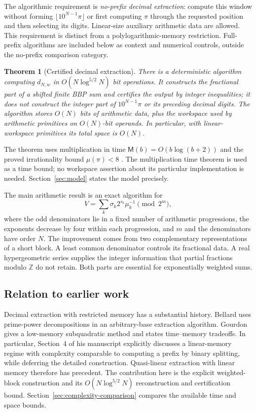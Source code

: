 \documentclass[11pt]{article}
\numberwithin{equation}{section}
\newtheorem{theorem}{Theorem}[section]
\theoremstyle{definition}
\newcommand{\Z}{\mathbb Z}
\newcommand{\M}{\mathsf M}
\begin{document}
The algorithmic requirement is \emph{no-prefix decimal extraction}:
compute this window without forming $\lfloor10^{N-1}\pi\rfloor$ or
first computing $\pi$ through the requested position and then selecting
its digits. Linear-size auxiliary arithmetic data are allowed. This
requirement is distinct from a polylogarithmic-memory restriction.
Full-prefix algorithms are included below as context and numerical
controls, outside the no-prefix comparison category.

\begin{theorem}[Certified decimal extraction]\label{thm:main}
There is a deterministic algorithm computing $d_{N,w}$ in
$O(N\log^{5/2}N)$ bit operations. It constructs the fractional part of a
shifted finite BBP sum and certifies the output by integer inequalities;
it does not construct the integer part of $10^{N-1}\pi$ or its preceding
decimal digits. The algorithm stores $O(N)$ bits of arithmetic data,
plus the workspace used by arithmetic primitives on $O(N)$-bit operands.
In particular, with linear-workspace primitives its total space is $O(N)$.
\end{theorem}

The theorem uses multiplication in time
$\M(b)=O(b\log(b+2))$ \cite{HvdH21} and the proved irrationality bound
$\mu(\pi)<8$ \cite{ZZ20}. The multiplication time theorem is used as a
time bound; no workspace assertion about its particular implementation
is needed. Section~\ref{sec:model} states the model precisely.

The main arithmetic result is an exact algorithm for
\begin{equation}\label{eq:core-intro}
 V=\sum_k \sigma_k 2^{s_k}\mu_k^{-1}\pmod{2^m},
\end{equation}
where the odd denominators lie in a fixed number of arithmetic
progressions, the exponents decrease by four within each progression,
and $m$ and the denominators have order $N$.
The improvement comes from two complementary representations of a
short block. A least common denominator controls its fractional data.
A real hypergeometric series supplies the integer information that
partial fractions modulo $\Z$ do not retain. Both parts are essential
for exponentially weighted sums.

\subsection{Relation to earlier work}

Decimal extraction with restricted memory has a substantial history.
Bellard \cite{Bellard97} uses prime-power decompositions in an
arbitrary-base extraction algorithm. Gourdon \cite{Gourdon03} gives a
low-memory subquadratic method and states time--memory tradeoffs.
In particular, Section~4 of his manuscript explicitly discusses a
linear-memory regime with complexity comparable to computing a prefix
by binary splitting, while deferring the detailed construction.
Quasi-linear extraction with linear memory therefore has precedent.
The contribution here is the explicit weighted-block construction
and its $O(N\log^{5/2}N)$ reconstruction and certification bound.
Section~\ref{sec:complexity-comparison} compares the available
time and space bounds.
\end{document}

